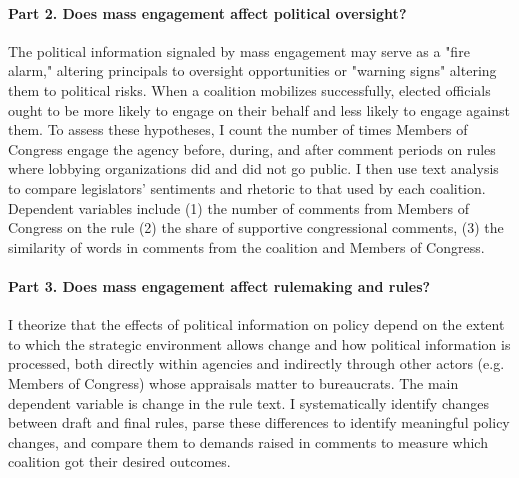 \paragraph{Part 2. Does mass engagement affect political oversight?} The political information signaled by mass engagement may serve as a "fire alarm," altering principals to oversight opportunities or "warning signs" altering them to political risks.
When a coalition mobilizes successfully, %
elected officials ought to be more likely to engage on their behalf and less likely to engage against them.
To assess these hypotheses, I count the number of times Members of Congress engage the agency before, during, and after comment periods on rules where lobbying organizations did and did not go public. I then use text analysis to compare legislators' sentiments and rhetoric to that used by each coalition.
Dependent variables include 
(1) the number of comments from Members of Congress on the rule %
(2) the share of supportive congressional comments, %
(3) the similarity of words in comments from the coalition and Members of Congress. 

\paragraph{Part 3. Does mass engagement affect rulemaking and rules?} 
I theorize that the effects of political information on policy depend on the extent to which the strategic environment allows change and how political information is processed, both directly within agencies and indirectly through other actors (e.g. Members of Congress) whose appraisals matter to bureaucrats.
The main dependent variable is change in the rule text.
I systematically identify changes between draft and final rules, parse these differences to identify meaningful policy changes, and compare them to demands raised in comments to measure which coalition got their desired outcomes.%